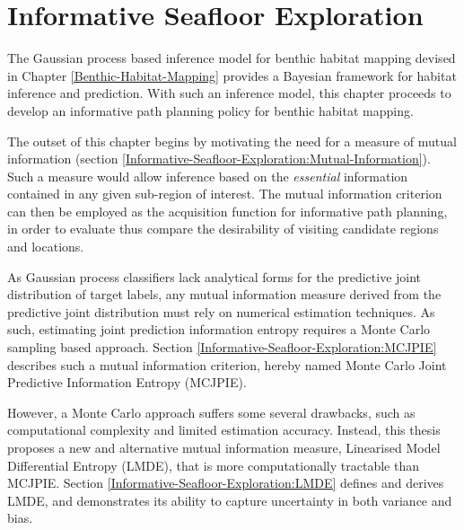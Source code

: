 \chapter{Informative Seafloor Exploration}
\label{Informative-Seafloor-Exploration}

	The Gaussian process based inference model for benthic habitat mapping devised in Chapter \ref{Benthic-Habitat-Mapping} provides a Bayesian framework for habitat inference and prediction. With such an inference model, this chapter proceeds to develop an informative path planning policy for benthic habitat mapping.
	
	The outset of this chapter begins by motivating the need for a measure of mutual information (section \ref{Informative-Seafloor-Exploration:Mutual-Information}). Such a measure would allow inference based on the \textit{essential} information contained in any given sub-region of interest. The mutual information criterion can then be employed as the acquisition function for informative path planning, in order to evaluate thus compare the desirability of visiting candidate regions and locations.
	
	
	As Gaussian process classifiers lack analytical forms for the predictive joint distribution of target labels, any mutual information measure derived from the predictive joint distribution must rely on numerical estimation techniques. As such, estimating joint prediction information entropy requires a Monte Carlo sampling based approach. Section \ref{Informative-Seafloor-Exploration:MCJPIE} describes such a mutual information criterion, hereby named Monte Carlo Joint Predictive Information Entropy (MCJPIE).
	
	However, a Monte Carlo approach suffers some several drawbacks, such as computational complexity and limited estimation accuracy. Instead, this thesis proposes a new and alternative mutual information measure, Linearised Model Differential Entropy (LMDE), that is more computationally tractable than MCJPIE. Section \ref{Informative-Seafloor-Exploration:LMDE} defines and derives LMDE, and demonstrates its ability to capture uncertainty in both variance and bias.
	
